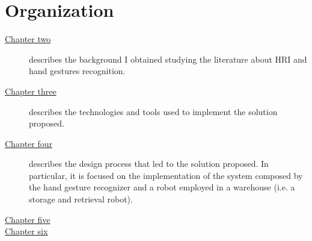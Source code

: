 \documentclass[../thesis.tex]{subfiles}
\begin{document}
\section{Organization}\label{s:organization}
\begin{description}
    \item[{\hyperref[cap:theory]{Chapter two}}] describes the background I obtained studying the literature about \acrlong{HRI} and hand gestures recognition.
    \item[{\hyperref[cap:methods]{Chapter three}}] describes the technologies and tools used to implement the solution proposed.
    \item[{\hyperref[cap:results]{Chapter four}}] describes the design process that led to the solution proposed. In particular, it is focused on the implementation of the system composed by the hand gesture recognizer and a robot employed in a warehouse (i.e. a storage and retrieval robot).
    \item[{\hyperref[cap:discussion]{Chapter five}}]
    \item[{\hyperref[cap:conclusion]{Chapter six}}]
\end{description}
\end{document}

